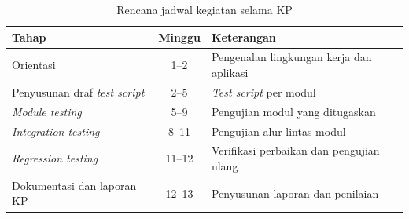 \begin{table}[H]
\caption{Rencana jadwal kegiatan selama KP}
\label{tab:jadwal-kerja}
\centering
\begin{tabularx}{\textwidth}{|p{5cm}|c|X|}
\hline
\textbf{Tahap} & \textbf{Minggu} & \textbf{Keterangan} \\
\hline
Orientasi & 1--2 & Pengenalan lingkungan kerja dan aplikasi \\
\hline
Penyusunan draf \textit{test script} & 2--5 & \textit{Test script} per modul \\
\hline
\textit{Module testing} & 5--9 & Pengujian modul yang ditugaskan \\
\hline
\textit{Integration testing} & 8--11 & Pengujian alur lintas modul \\
\hline
\textit{Regression testing} & 11--12 & Verifikasi perbaikan dan pengujian ulang \\
\hline
Dokumentasi dan laporan KP & 12--13 & Penyusunan laporan dan penilaian \\
\hline
\end{tabularx}
\end{table}
